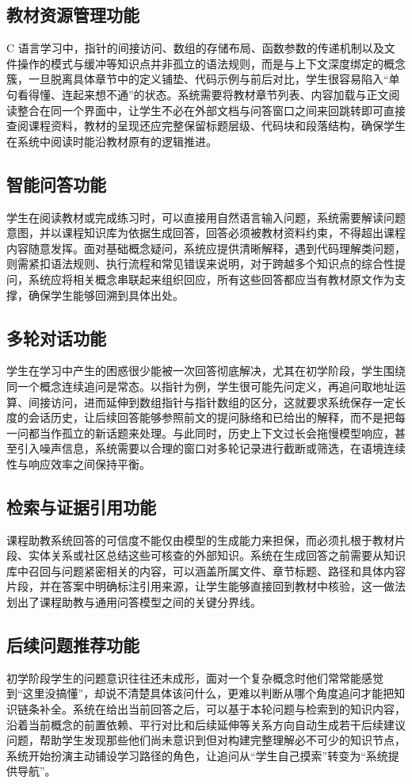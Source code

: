 \subsection{教材资源管理功能}
C 语言学习中，指针的间接访问、数组的存储布局、函数参数的传递机制以及文件操作的模式与缓冲等知识点并非孤立的语法规则，而是与上下文深度绑定的概念簇，一旦脱离具体章节中的定义铺垫、代码示例与前后对比，学生很容易陷入“单句看得懂、连起来想不通”的状态。系统需要将教材章节列表、内容加载与正文阅读整合在同一个界面中，让学生不必在外部文档与问答窗口之间来回跳转即可直接查阅课程资料，教材的呈现还应完整保留标题层级、代码块和段落结构，确保学生在系统中阅读时能沿教材原有的逻辑推进。

\subsection{智能问答功能}
学生在阅读教材或完成练习时，可以直接用自然语言输入问题，系统需要解读问题意图，并以课程知识库为依据生成回答，回答必须被教材资料约束，不得超出课程内容随意发挥。面对基础概念疑问，系统应提供清晰解释，遇到代码理解类问题，则需紧扣语法规则、执行流程和常见错误来说明，对于跨越多个知识点的综合性提问，系统应将相关概念串联起来组织回应，所有这些回答都应当有教材原文作为支撑，确保学生能够回溯到具体出处。

\subsection{多轮对话功能}
学生在学习中产生的困惑很少能被一次回答彻底解决，尤其在初学阶段，学生围绕同一个概念连续追问是常态。以指针为例，学生很可能先问定义，再追问取地址运算、间接访问，进而延伸到数组指针与指针数组的区分，这就要求系统保存一定长度的会话历史，让后续回答能够参照前文的提问脉络和已给出的解释，而不是把每一问都当作孤立的新话题来处理。与此同时，历史上下文过长会拖慢模型响应，甚至引入噪声信息，系统需要以合理的窗口对多轮记录进行截断或筛选，在语境连续性与响应效率之间保持平衡。

\subsection{检索与证据引用功能}
课程助教系统回答的可信度不能仅由模型的生成能力来担保，而必须扎根于教材片段、实体关系或社区总结这些可核查的外部知识。系统在生成回答之前需要从知识库中召回与问题紧密相关的内容，可以涵盖所属文件、章节标题、路径和具体内容片段，并在答案中明确标注引用来源，让学生能够直接回到教材中核验，这一做法划出了课程助教与通用问答模型之间的关键分界线。

\subsection{后续问题推荐功能}
初学阶段学生的问题意识往往还未成形，面对一个复杂概念时他们常常能感觉到“这里没搞懂”，却说不清楚具体该问什么，更难以判断从哪个角度追问才能把知识链条补全。系统在给出当前回答之后，可以基于本轮问题与检索到的知识内容，沿着当前概念的前置依赖、平行对比和后续延伸等关系方向自动生成若干后续建议问题，帮助学生发现那些他们尚未意识到但对构建完整理解必不可少的知识节点，系统开始扮演主动铺设学习路径的角色，让追问从“学生自己摸索”转变为“系统提供导航”。

